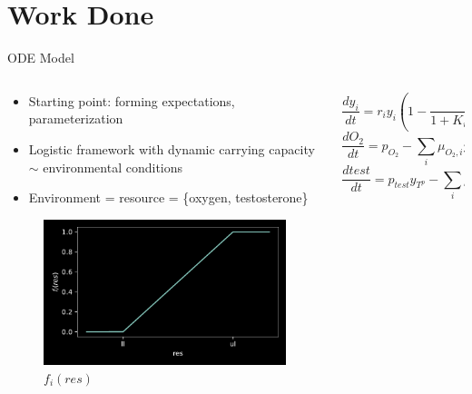 \documentclass[aspectratio=169,9pt]{beamer}
\begin{document}
\section{Work Done}
\begin{frame}{ODE Model}
  \begin{columns}
    \begin{column}{0.4\textwidth}
      \begin{itemize}
        \item Starting point: forming expectations, parameterization
        \item Logistic framework with dynamic carrying capacity $\sim$ environmental conditions
        \item Environment = resource = \{oxygen, testosterone\}
      \end{itemize}
      \begin{figure}
        \includegraphics[width=\textwidth]{f_res}
        \caption{$f_i(res)$}
      \end{figure}
    \end{column}
    \begin{column}{0.6\textwidth}
      \begin{equation}
        \frac{dy_i}{dt} = r_i y_i (1 - \frac{\sum_j y_j}{1 + K_{i,max} f_i(O_2) f_i(test)} )- \delta_i y_i
        \label{celleq}
      \end{equation}
      \begin{equation}
        \frac{dO_2}{dt} = p_{O_2} - \sum_i \mu_{O_2,i} y_i - \lambda_{O_2} O_2
        \label{o2eq}
      \end{equation}
      \begin{equation}
        \frac{dtest}{dt} = p_{test} y_{T^p} - \sum_i \mu_{test,i} y_i - \lambda_{test} test
        \label{testeq}
      \end{equation}

\end{column}
\end{columns}
\end{frame}
\end{document}
